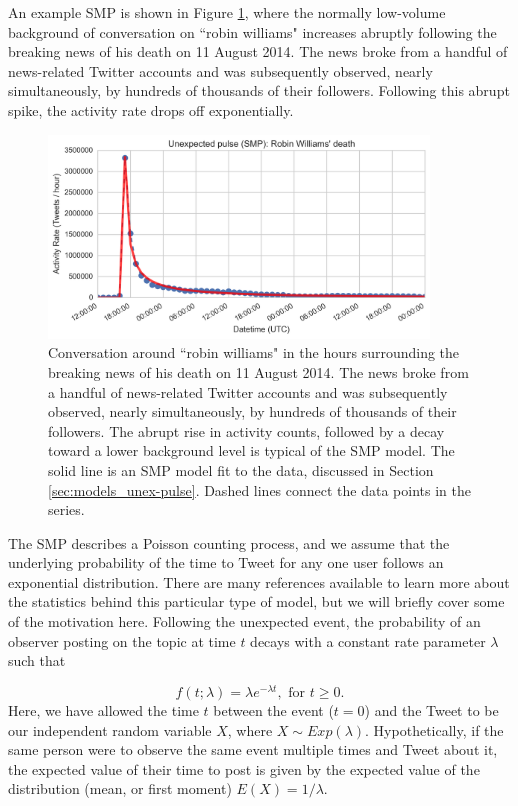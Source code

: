 \documentclass{article}
\begin{document}
An example SMP is shown in Figure \ref{fig:williams}, where the normally low-volume background of conversation on ``robin williams" increases abruptly following the breaking news of his death on 11 August 2014. The news broke from a handful of news-related Twitter accounts and was subsequently observed, nearly simultaneously, by hundreds of thousands of their followers. Following this abrupt spike, the activity rate drops off exponentially.  


\begin{figure}[!b]
\centering
\includegraphics[width=0.9\textwidth]{img/williams.png}
\caption{Conversation around ``robin williams" in the hours surrounding the breaking news of his death on 11 August 2014. The news broke from a handful of news-related Twitter accounts and was subsequently observed, nearly simultaneously, by hundreds of thousands of their followers. The abrupt rise in activity counts, followed by a decay toward a lower background level is typical of the SMP model. The solid line is an SMP model fit to the data, discussed in Section \ref{sec:models_unex-pulse}. Dashed lines connect the data points in the series.}
\label{fig:williams}
\end{figure}


The SMP describes a Poisson counting process, and we assume that the underlying probability of the time to Tweet for any one user follows an exponential distribution. There are many references available to learn more about the statistics behind this particular type of model,\cite{wiki:poisson} but we will briefly cover some of the motivation here. Following the unexpected event, the probability of an observer posting on the topic at time $t$ decays with a constant rate parameter $\lambda$ such that

\begin{equation}
f(t;\lambda) = \lambda e^{-\lambda t}, \text{ for } t \geq 0.
\label{eq:exponential}
\end{equation}
Here, we have allowed the time $t$ between the event ($t=0$) and the Tweet to be our independent random variable $X$, where $X \sim Exp(\lambda)$. Hypothetically, if the same person were to observe the same event multiple times and Tweet about it, the expected value of their time to post is given by the expected value of the distribution (mean, or first moment) $E(X)=1/\lambda$.
\end{document}
